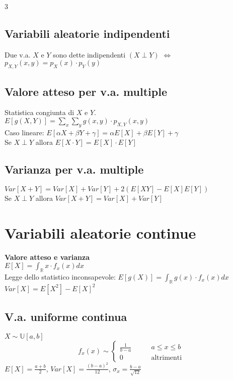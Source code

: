 \documentclass{article}
\begin{document}
\begin{multicols*}{3}
		\subsection{Variabili aleatorie indipendenti}
		Due v.a. \(X\) e \(Y\) sono dette indipendenti \((X\perp Y)\) \(\iff\) \(p_{X,Y} (x,y) = p_X (x)\cdot p_Y (y) \)\\
		
		\subsection{Valore atteso per v.a. multiple}
		Statistica congiunta di \(X\) e \(Y\).\\
		\(E[g(X,Y)] = \sum_{x}^{}\sum_{y}^{} g(x,y) \cdot p_{X,Y} (x,y)\)\\
		Caso lineare: \(E[\alpha X + \beta Y + \gamma] = \alpha E[X] + \beta E[Y] + \gamma\) \\
		Se \(X \perp Y\) allora \(E[X \cdot Y] = E[X] \cdot E[Y]\)
		
		\subsection{Varianza per v.a. multiple}
		\(Var[X+Y]= Var[X] + Var[Y] +2(E[XY] -E[X]E[Y])\)\\
		Se \(X\perp Y\) allora \(Var[X+Y] = Var[X] + Var[Y]\)\\
		
		\section{Variabili aleatorie continue}
		\textbf{Valore atteso e varianza}\\
		\(E[X] = \int_{\mathbb{R}}^{} x \cdot f_x (x) dx\)\\
		Legge dello statistico inconsapevole: \(E[g(X)] = \int_{\mathbb{R}}^{} g(x) \cdot f_x (x) dx\)\\
		\(Var[X] = E[X^2] - E[X]^2\)
		
		\subsection{V.a. uniforme continua}
		\(X \sim \mathbb{U}[a,b] \)\\
		\begin{equation*}
			f_x (x) \sim
			\left\{
			\begin{alignedat}{2}
				\frac{1}{b-a}  & \qquad a\leq x \leq b\\
				0            & \qquad \text{altrimenti}
			\end{alignedat}
			\right.
		\end{equation*}
		\(E[X] = \frac{a+b}{2}\), \(Var[X] = \frac{(b-a)^2}{12}\), \(\sigma_x = \frac{b-a}{\sqrt{12}}\)\\
		

\end{multicols*}
\end{document}
